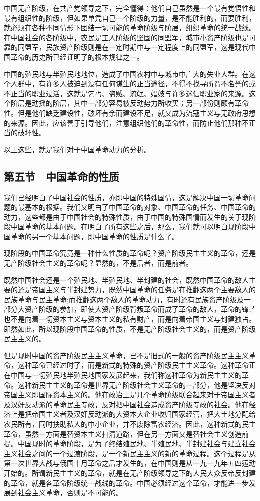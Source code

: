 中国无产阶级，在共产党领导之下，完全懂得：他们自己虽然是一个最有觉悟性和最有组织性的阶级，但如果单凭自己一个阶级的力量，是不能胜利的，而要胜利，就必须在各种不同情形下团结一切可能的革命阶级与阶层，组织革命的统一战线。在中国社会的各阶级中，农民是工人阶级的坚固的同盟军，城市小资产阶级也是可靠的同盟军，民族资产阶级则是在一定时期中与一定程度上的同盟军，这是现代中国革命的历史所已经证明了的根本规律之一。

中国的殖民地与半殖民地地位，造成了中国农村中与城市中广大的失业人群。在这个人群中，有许多人被迫到没有任何谋生的正当途径，不得不找寻所谓不名誉的或不正当的职业过活，这就是乞丐、盗贼、流氓、娼妓与许多迷信职业家的来源。这个阶层是动摇的阶层，其中一部分容易被反动势力所收买；另一部份则颇有革命性。但是他们缺乏建设性，破坏有余而建设不足，就又成为流寇主义与无政府思想的来源。因此，应该善于引导他们，注意组织他们的革命性，而防止他们那种不正当的破坏性。

以上这些，就是我们对于中国革命动力的分析。

\subsection{第五节　中国革命的性质}

我们已经明白了中国社会的性质，亦即中国的特殊国情，这是解决中国一切革命问题的最基本的根据。我们又明白了中国革命的对象、中国革命的任务、中国革命的动力，这些都是由于中国社会的特殊性质，由于中国的特殊国情而发生的关于现阶段中国革命的基本问题。在明白了所有这些之后，那么，我们就可以明白现阶段中国革命的另一个基本问题，即中国革命的性质是什么了。

现阶段的中国革命究竟是一种什么性质的革命呢？资产阶级民主主义的革命，还是无产阶级社会主义的革命呢？显然的，不是后者，而是前者。

既然中国社会还是一个殖民地、半殖民地、半封建的社会，既然中国革命的敌人主要的还是帝国主义与半封建势力，既然中国革命的任务是在推翻这两个主要敌人的民族革命与民主革命;而推翻这两个敌人的革命动力，有时还有民族资产阶级及一部分大资产阶级的参加，即使大资产阶级背叛革命而成了革命的敌人，革命的锋芒也不是向着一切资本主义与资本主义的私有财产，而是向着帝国主义与封建独占。即然如此，所以现阶段中国革命的性质，不是无产阶级社会主义的，而是资产阶级民主主义的。

但是现时中国的资产阶级民主主义革命，已不是旧式的一般的资产阶级民主主义革命，这种革命已经过时了，而是新式的特殊的资产阶级民主主义革命。这种革命正在中国与一切殖民地半殖民地国家发展起来，我们称这种革命为新民主主义的革命。这种新民主主义的革命是世界无产阶级社会主义革命的一部分，他是坚决反对帝国主义即国际资本主义的。他在政治上是几个革命阶级联合起来对于帝国主义者及汉奸反动派的革命民主专政，反对把中国社会造成资产阶级专政的社会。他在经济上是把帝国主义者及汉奸反动派的大资本大企业收归国家经营，把大土地分配给农民所有，同时扶助私人的中小企业，并不废除富农经济。因此，这种新式的民主革命，虽然一方面是替资本主义扫清道路，但在另一方面又是替社会主义创造前提。中国现时的革命阶段，是为了终结殖民地、半殖民地、半封建社会与建立社会主义社会之间的一个过渡阶段，是一个新民主主义的新的革命过程。这个过程是从第一次世界大战与俄国十月革命之后才发生的，在中国则是从一九一九年五四运动开始的。所谓新民主主义的革命，就是在无产阶级领导之下的人民大众反帝反封建的革命，就是各革命阶级统一战线的革命。中国必须经过这个革命，才能进一步发展到社会主义革命，否则是不可能的。

